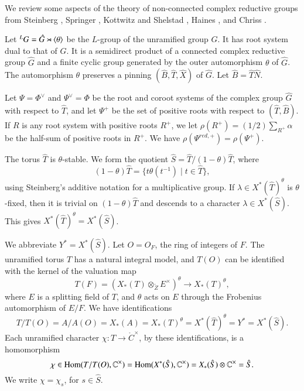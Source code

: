 We review some aspects of the theory of non-connected complex
reductive groups from Steinberg \cite{steinberg1968endomorphisms},
Springer \cite{springer2010linear}, Kottwitz and Shelstad
\cite{kottwitz1999foundations}, Haines \cite{haines2016dualities}, and
Chriss \cite{chriss}.

Let ${}^LG = \hat G \rtimes \langle{\theta}\rangle$ be the $L$-group of the
unramified group $G$.  It has root system dual to that of $G$.  It is
a semidirect product of a connected complex reductive group $\hat G$
and a finite cyclic group generated by the outer automorphism $\theta$
of $\hat G$.  The automorphism $\theta$ preserves a pinning $(\hat
B,\hat T,\hat X)$ of $\hat G$. Let $\hat B = \hat T\hat N$.

Let $\Psi=\Phi^\vee$ and $\Psi^\vee=\Phi$ be the root and coroot
systems of the complex group $\hat G$ with respect to $\hat T$, and
let $\Psi^+$ be the set of positive roots with respect to $(\hat
T,\hat B)$.  If $R$ is any root system with positive roots $R^+$, we
let $\rho(R^+) = (1/2)\sum_{R^+} \alpha$ be the half-sum of positive
roots in $R^+$.  We have $\rho(\Psi^{red,+}) = \rho(\Psi^+)$.

The torus $\hat T$ is $\theta$-stable.  We form the quotient $\hat S =
\hat T/(1-\theta) \hat T$, where
\[
(1-\theta)\hat T = \{ t\theta(t^{-1}) \mid t\in \hat T\},
\]
using Steinberg's additive notation for a multiplicative group.  If
$\lambda\in X^*(\hat T)^\theta$ is $\theta$-fixed, then it is trivial
on $(1-\theta)\hat T$ and descends to a character $\lambda\in X^*(\hat
S)$.  This gives $X^*(\hat T)^\theta = X^*(\hat S)$.

We abbreviate $Y^* = X^*(\hat S)$. Let $O=O_F$, the ring of integers
of $F$.  The unramified torus $T$ has a natural integral model, and
$T(O)$
can be identified with the kernel of the valuation map
\[
T(F) = (X_*(T)\otimes_\ring{Z} E^\times)^\theta \to X_*(T)^\theta,
\]
where $E$ is a splitting field of $T$, and $\theta$ acts on $E$ through the Frobenius
automorphism of $E/F$.
We have identifications
\begin{equation}\label{eqn:identify}
T/T(O)=A/A(O)=X_*(A)=X_*(T)^\theta  =X^*(\hat T)^\theta = Y^* = X^*(\hat S).
\end{equation}
Each unramified character $\chi:T\to \ring{C}^\times$, by these
identifications, is a homomorphism
\begin{equation}
\chi\in{\operatorname{Hom}}(T/T(O),\mathbb{C}^\times) = 
{\operatorname{Hom}}(X^*(\hat S),\mathbb{C}^\times) = 
X_*(\hat S)\otimes \mathbb{C}^\times = \hat S.
\end{equation}
We write $\chi = \chi_s$, for $s\in\hat S$.

